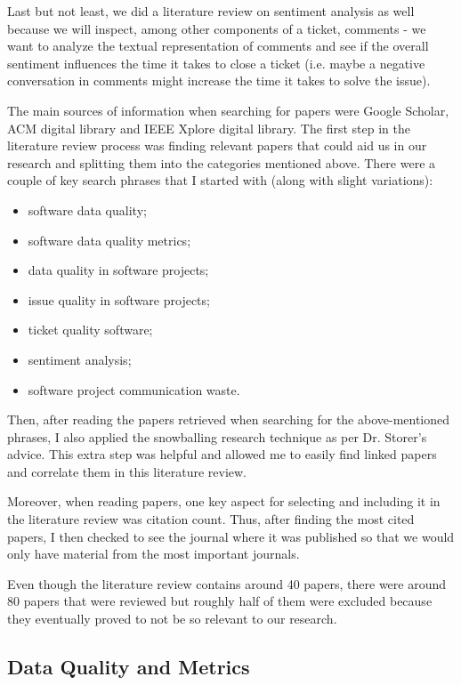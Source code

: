 \documentclass{mprop}
\begin{document}
Last but not least, we did a literature review on sentiment analysis as well 
because we will inspect, among other components of a ticket, comments - we want 
to analyze the textual representation of comments and see if the overall 
sentiment influences the time it takes to close a ticket (i.e. maybe a negative 
conversation in comments might increase the time it takes to solve the issue).

The main sources of information when searching for papers were Google Scholar, 
ACM digital library and IEEE Xplore digital library. The first step in the 
literature review process was finding relevant papers that could aid us in
our research and splitting them into the categories mentioned above. There were
a couple of key search phrases that I started with (along with slight variations):
  \begin{itemize}
    \item software data quality;
    \item software data quality metrics;
    \item data quality in software projects;
    \item issue quality in software projects;
    \item ticket quality software;
    \item sentiment analysis;
    \item software project communication waste.
  \end{itemize}

Then, after reading the papers retrieved when searching for the above-mentioned
phrases, I also applied the snowballing research technique as per Dr. Storer's 
advice. This extra step was helpful and allowed me to easily find linked 
papers and correlate them in this literature review.

Moreover, when reading papers, one key aspect for selecting and including it
in the literature review was citation count. Thus, after finding the most 
cited papers, I then checked to see the journal where it was published so that
we would only have material from the most important journals.

Even though the literature review contains around 40 papers, there were
around 80 papers that were reviewed but roughly half of them were excluded 
because they eventually proved to not be so relevant to our research. 

\subsection{Data Quality and Metrics}
\end{document}
